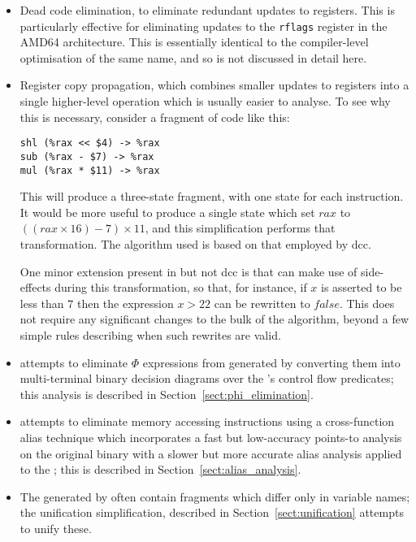 \begin{itemize}
\item
  Dead code elimination, to eliminate redundant updates to registers.
  This is particularly effective for eliminating updates to the
  \verb|rflags| register in the AMD64 architecture. This is
  essentially identical to the compiler-level optimisation of the same
  name\needCite{}, and so is not discussed in detail here.
\item
  Register copy propagation, which combines smaller updates to
  registers into a single higher-level operation which is usually
  easier to analyse.  To see why this is necessary, consider
  a fragment of code like this:

\begin{verbatim}
shl (%rax << $4) -> %rax
sub (%rax - $7) -> %rax
mul (%rax * $11) -> %rax
\end{verbatim}
  
  This will produce a three-state {\StateMachine} fragment, with one
  state for each instruction.  It would be more useful to produce a
  single state which set $rax$ to $((rax \times 16) - 7) \times 11$,
  and this simplification performs that transformation.  The algorithm
  used is based on that employed by dcc\needCite{}.

  One minor extension present in {\implementation} but not dcc is that
  {\implementation} can make use of  side-effects during
  this transformation, so that, for instance, if $x$ is asserted to be
  less than $7$ then the expression $x > 22$ can be rewritten to
  $false$.  This does not require any significant changes to the bulk
  of the algorithm, beyond a few simple rules describing when such
  rewrites are valid.
\item
  {\Technique} attempts to eliminate $\Phi$ expressions from generated
  {\StateMachines} by converting them into multi-terminal binary
  decision diagrams over the {\StateMachine}'s control flow predicates;
  this analysis is described in Section~\ref{sect:phi_elimination}.
\item
  {\Technique} attempts to eliminate memory accessing instructions
  using a cross-function alias technique which incorporates a fast but
  low-accuracy points-to analysis on the original binary with a slower
  but more accurate alias analysis applied to the {\StateMachine};
  this is described in Section~\ref{sect:alias_analysis}.
\item
  The {\StateMachines} generated by {\technique} often contain
  fragments which differ only in variable names; the unification
  simplification, described in Section~\ref{sect:unification} attempts
  to unify these.
\end{itemize}

